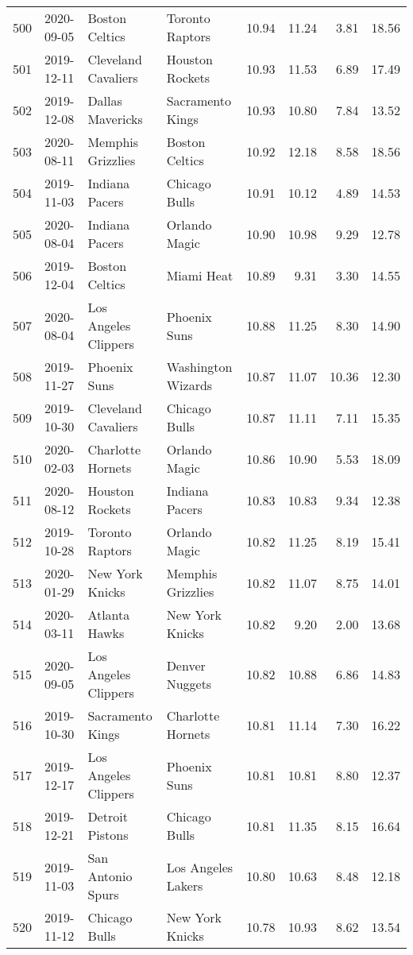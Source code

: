 \documentclass[
  11pt,
]{article}
\theoremstyle{nonumberplain}
\begin{document}
\begin{longtable}{rl|llr|rrr}
500 & 2020-09-05 & Boston Celtics & Toronto Raptors & 10.94 & 11.24 & 3.81 & 18.56\\
501 & 2019-12-11 & Cleveland Cavaliers & Houston Rockets & 10.93 & 11.53 & 6.89 & 17.49\\
502 & 2019-12-08 & Dallas Mavericks & Sacramento Kings & 10.93 & 10.80 & 7.84 & 13.52\\
503 & 2020-08-11 & Memphis Grizzlies & Boston Celtics & 10.92 & 12.18 & 8.58 & 18.56\\
504 & 2019-11-03 & Indiana Pacers & Chicago Bulls & 10.91 & 10.12 & 4.89 & 14.53\\
505 & 2020-08-04 & Indiana Pacers & Orlando Magic & 10.90 & 10.98 & 9.29 & 12.78\\
506 & 2019-12-04 & Boston Celtics & Miami Heat & 10.89 & 9.31 & 3.30 & 14.55\\
507 & 2020-08-04 & Los Angeles Clippers & Phoenix Suns & 10.88 & 11.25 & 8.30 & 14.90\\
508 & 2019-11-27 & Phoenix Suns & Washington Wizards & 10.87 & 11.07 & 10.36 & 12.30\\
509 & 2019-10-30 & Cleveland Cavaliers & Chicago Bulls & 10.87 & 11.11 & 7.11 & 15.35\\
510 & 2020-02-03 & Charlotte Hornets & Orlando Magic & 10.86 & 10.90 & 5.53 & 18.09\\
511 & 2020-08-12 & Houston Rockets & Indiana Pacers & 10.83 & 10.83 & 9.34 & 12.38\\
512 & 2019-10-28 & Toronto Raptors & Orlando Magic & 10.82 & 11.25 & 8.19 & 15.41\\
513 & 2020-01-29 & New York Knicks & Memphis Grizzlies & 10.82 & 11.07 & 8.75 & 14.01\\
514 & 2020-03-11 & Atlanta Hawks & New York Knicks & 10.82 & 9.20 & 2.00 & 13.68\\
515 & 2020-09-05 & Los Angeles Clippers & Denver Nuggets & 10.82 & 10.88 & 6.86 & 14.83\\
516 & 2019-10-30 & Sacramento Kings & Charlotte Hornets & 10.81 & 11.14 & 7.30 & 16.22\\
517 & 2019-12-17 & Los Angeles Clippers & Phoenix Suns & 10.81 & 10.81 & 8.80 & 12.37\\
518 & 2019-12-21 & Detroit Pistons & Chicago Bulls & 10.81 & 11.35 & 8.15 & 16.64\\
519 & 2019-11-03 & San Antonio Spurs & Los Angeles Lakers & 10.80 & 10.63 & 8.48 & 12.18\\
520 & 2019-11-12 & Chicago Bulls & New York Knicks & 10.78 & 10.93 & 8.62 & 13.54\\

\end{longtable}
\end{document}
